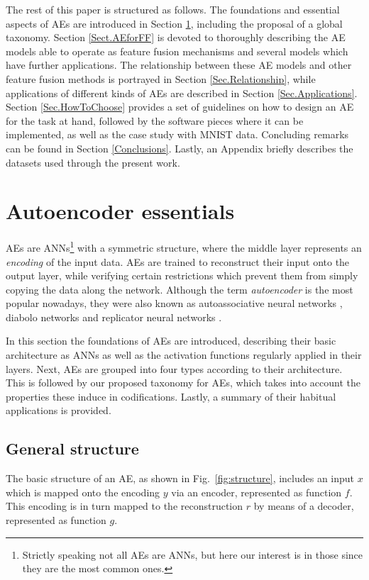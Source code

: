 \documentclass[preprint,5p,compress]{elsarticle}
\begin{document}
    The rest of this paper is structured as follows. The foundations and essential aspects of AEs are introduced in Section \ref{Sec.Essentials}, including the proposal of a global taxonomy. Section \ref{Sect.AEforFF} is devoted to thoroughly describing the AE models able to operate as feature fusion mechanisms 
    and several models which have further applications. The relationship between these AE models and other feature fusion methods is portrayed in Section \ref{Sec.Relationship}, while applications of different kinds of AEs are described in Section \ref{Sec.Applications}. Section \ref{Sec.HowToChoose} provides a set of guidelines on how to design an AE for the task at hand, followed by the software pieces where it can be implemented, as well as the case study with MNIST data. Concluding remarks can be found in Section \ref{Conclusions}. Lastly, an Appendix briefly describes the datasets used through the present work.

\section{Autoencoder essentials}\label{Sec.Essentials} 


AEs are ANNs\footnote{Strictly speaking not all AEs are ANNs, but here our interest is in those since they are the most common ones.} with a symmetric structure, where the middle layer represents an \textit{encoding} of the input data. AEs are trained to reconstruct their input onto the output layer, while verifying certain restrictions which prevent them from simply copying the data along the network. Although the term \textit{autoencoder} is the most popular nowadays, they were also known as autoassociative neural networks \cite{AutoassociativeNN}, diabolo networks \cite{DiaboloNN} and replicator neural networks \cite{ReplicatorNN}.

In this section the foundations of AEs are introduced, describing their basic architecture as ANNs as well as the activation functions regularly applied in their layers. Next, AEs are grouped into four types according to their architecture. This is followed by our proposed taxonomy for AEs, which takes into account the properties these induce in codifications. Lastly, a summary of their habitual applications is provided.

\subsection{General structure}
The basic structure of an AE, as shown in Fig.~\ref{fig:structure}, includes an input $x$ which is mapped onto the encoding $y$ via an encoder, represented as function $f$. This encoding is in turn mapped to the reconstruction $r$ by means of a decoder, represented as function $g$.
\end{document}
